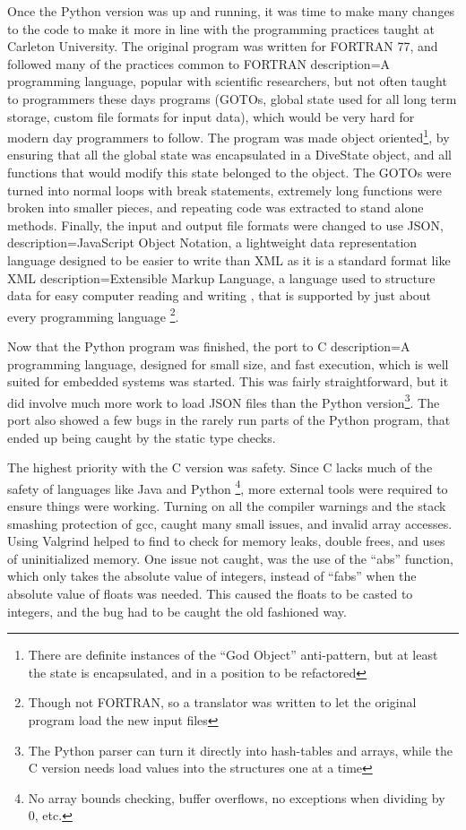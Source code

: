 \documentclass[12pt]{article}
\begin{document}
 Once the Python version was up and running, it was time to make many changes to the code to make it more
in line with the programming practices taught at Carleton University. The original program was written for FORTRAN 77,
and followed many of the practices common to FORTRAN { description={A programming language, popular with scientific researchers, but
not often taught to programmers these days}}
programs (GOTOs, global state used for all long term storage,
custom file formats for input data), which would be very hard for modern day programmers to follow. The program
was made object oriented\footnote{There are definite instances of the ``God Object'' anti-pattern, but at least the state is encapsulated, and in a position to be refactored}, by ensuring that all the global state was encapsulated in a DiveState object, and all functions that would modify this state belonged to the object.
The GOTOs were turned into normal loops with break statements, extremely long functions were broken into smaller
pieces, and repeating code was extracted to stand alone methods. Finally,  the input and output file formats were changed
to use JSON, { description={JavaScript Object Notation, a lightweight data representation language
designed to be easier to write than XML}}
 as it is a standard format like XML { description={Extensible Markup Language, a language used
to structure data for easy computer reading and writing}}
, that is supported by just about every programming language \footnote{Though not FORTRAN, so a translator was written to let the original program load the new input files}.

 Now that the Python program was finished, the port to C { description={A programming language, designed for small size, and fast execution, which is 
well suited for embedded systems}}
 was started. This was fairly straightforward, but it did involve
much more work to load JSON files than the Python version\footnote{The Python parser can turn it 
directly into hash-tables and arrays, while the C version
needs load values into the structures one at a time}. The port also showed a few bugs in the rarely run parts
of the Python program, that ended up being caught by the static type checks.

The highest priority with the C version was safety. Since C lacks much of the safety of languages
like Java and Python \footnote{No array bounds checking, buffer overflows, no exceptions when dividing by 0, etc.}, more
external tools were required to ensure things were working. Turning on all the compiler warnings and the stack
smashing protection of gcc, caught many small issues, and invalid array accesses. Using Valgrind helped to find
to check for memory leaks, double frees, and uses of uninitialized memory. One issue not caught, was the use
of the ``abs'' function, which only takes the absolute value of integers, instead of ``fabs'' when the absolute value of floats was needed. This caused the floats to be casted to integers, and the bug had to be caught the old fashioned way.
\end{document}
